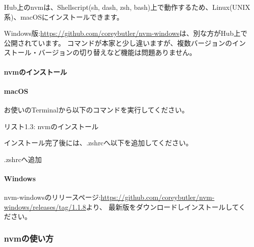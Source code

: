 Hub上のnvmは、Shellscript(sh, dash, zsh, bash)上で動作するため、Linux(UNIX系)、macOSにインストールできます。

Windows版:\url{https://github.com/coreybutler/nvm-windows}は、別な方がHub上で公開されています。
コマンドが本家と少し違いますが、複数バージョンのインストール・バージョンの切り替えなど機能は問題ありません。

\paragraph*{nvmのインストール}
\paragraph*{macOS}
お使いのTerminalから以下のコマンドを実行してください。

\def\startercodeblockfontsize{}
\begin{starterterminal}[_080915400]{リスト1.3: nvmのインストール}\end{starterterminal}

インストール完了後には、.zshrcへ以下を追加してください。

\def\startercodeblockfontsize{}
\begin{starterterminal}[]{.zshrcへ追加}\end{starterterminal}
\ParagraphEnd

\paragraph*{Windows}
nvm{-}windowsのリリースページ:\url{https://github.com/coreybutler/nvm-windows/releases/tag/1.1.8}より、
最新版をダウンロードしインストールしてください。

\ParagraphEnd

\subsubsection*{nvmの使い方}
\keeplastskip{
  \label{sec:1-1-3-1}
  \par\nobreak
}

